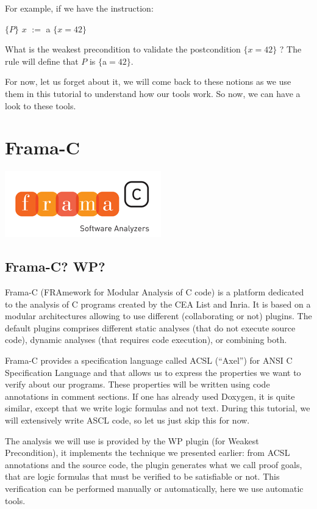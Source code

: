 \documentclass[12pt,francais,]{scrbook}
\begin{document}
For example, if we have the instruction:

\(\{P\}\) \(x\) \(:=\) a \(\{x = 42\}\)

What is the weakest precondition to validate the postcondition
\(\{x = 42\}\) ? The rule will define that \(P\) is \(\{\)a\(=42\}\).

For now, let us forget about it, we will come back to these notions as
we use them in this tutorial to understand how our tools work. So now,
we can have a look to these tools.

\section{Frama-C}\label{frama-c}

\begin{center}\includegraphics[scale=0.5]{framac.png}\end{center}

\subsection{Frama-C? WP?}\label{frama-c-wp}

Frama-C (FRAmework for Modular Analysis of C code) is a platform
dedicated to the analysis of C programs created by the CEA List and
Inria. It is based on a modular architectures allowing to use different
(collaborating or not) plugins. The default plugins comprises different
static analyses (that do not execute source code), dynamic analyses
(that requires code execution), or combining both.

Frama-C provides a specification language called ACSL (``Axel'') for
ANSI C Specification Language and that allows us to express the
properties we want to verify about our programs. These properties will
be written using code annotations in comment sections. If one has
already used Doxygen, it is quite similar, except that we write logic
formulas and not text. During this tutorial, we will extensively write
ASCL code, so let us just skip this for now.

The analysis we will use is provided by the WP plugin (for Weakest
Precondition), it implements the technique we presented earlier: from
ACSL annotations and the source code, the plugin generates what we call
proof goals, that are logic formulas that must be verified to be
satisfiable or not. This verification can be performed manually or
automatically, here we use automatic tools.
\end{document}
